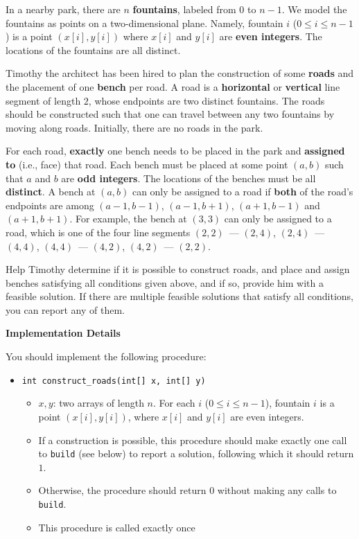 In a nearby park, there are $n$ \textbf{fountains}, labeled from $0$ to $n-1$. We model the fountains as points on a two-dimensional plane. Namely, fountain $i$ ($0\leq i\leq n-1$) is a point $(x[i],y[i])$ where $x[i]$ and $y[i]$ are \textbf{even integers}. The locations of the fountains are all distinct.

Timothy the architect has been hired to plan the construction of some \textbf{roads} and the placement of one \textbf{bench} per road. A road is a \textbf{horizontal} or \textbf{vertical} line segment of length $2$, whose endpoints
are two distinct fountains. The roads should be constructed such that one can travel between any two
fountains by moving along roads. Initially, there are no roads in the park.

For each road, \textbf{exactly} one bench needs to be placed in the park and \textbf{assigned to} (i.e., face) that road. Each bench must be placed at some point $(a, b)$ such that $a$ and $b$ are \textbf{odd integers}. The locations of the benches must be all \textbf{distinct}. A bench at $(a,b)$ can only be assigned to a road if
\textbf{both} of the road's endpoints are among $(a-1,b-1)$, $(a-1,b+1)$, $(a+1,b-1)$ and
$(a+1,b+1)$. For example, the bench at $(3,3)$ can only be assigned to a road, which is one of the four line segments $(2,2)$~--- $(2,4)$, $(2,4)$~--- $(4,4)$, $(4,4)$~--- $(4,2)$, $(4,2)$~--- $(2,2)$.

Help Timothy determine if it is possible to construct roads, and place and assign benches satisfying all
conditions given above, and if so, provide him with a feasible solution. If there are multiple feasible
solutions that satisfy all conditions, you can report any of them.

\textbf{Implementation Details}

You should implement the following procedure:

\begin{itemize}
\item \texttt{int construct\_roads(int[] x, int[] y)}
\begin{itemize}
\item $x,y$: two arrays of length $n$. For each $i$ ($0\leq i\leq n-1$), fountain $i$ is a point $(x[i],y[i])$, where $x[i]$ and $y[i]$ are even integers.
\item If a construction is possible, this procedure should make exactly one call to \texttt{build} (see below) to report a solution, following which it should return $1$.
\item Otherwise, the procedure should return $0$ without making any calls to  \texttt{build}.
\item This procedure is called exactly once
\end{itemize}
\end{itemize}

